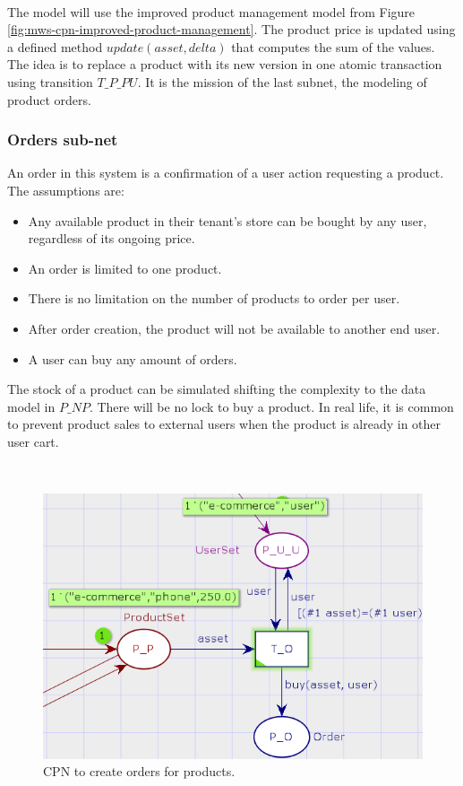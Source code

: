 \documentclass[12pt,english]{article} %
\begin{document}
\

The model will use the improved product management model from Figure \ref{fig:mws-cpn-improved-product-management}.
The product price is updated using a defined method $update(asset, delta)$ that computes the sum of the values.
The idea is to replace a product with its new version in one atomic transaction using transition $T\_P\_PU$.
It is the mission of the last subnet, the modeling of product orders.


\subsubsection{Orders sub-net}
An order in this system is a confirmation of a user action requesting a product.
The assumptions are:

\begin{itemize}
    \item Any available product in their tenant's store can be bought by any user, regardless of its ongoing price.
    \item An order is limited to one product.
    \item There is no limitation on the number of products to order per user.
    \item After order creation, the product will not be available to another end user.
    \item A user can buy any amount of orders.
\end{itemize}

The stock of a product can be simulated shifting the complexity to the data model in $P\_NP$.
There will be no lock to buy a product.
In real life, it is common to prevent product sales to external users when the product is already in other user cart.

\

\begin{figure}[H]
    \centering
    \includegraphics[scale=0.7]{img/mws/cpn/mws_cpn_order_initial.png}
    \caption{CPN to create orders for products.}
    \label{fig:mws-cpn-order-initial}
\end{figure}
\end{document}
